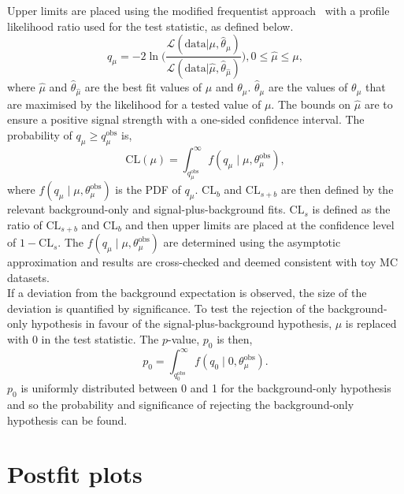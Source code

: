 Upper limits are placed using the modified frequentist approach~\cite{Junk:1999kv,Read:2002hq} with a profile likelihood ratio used for the test statistic, as defined below.
\begin{equation}
  q_{\mu} = -2 \ln \Biggl(\frac{\mathcal{L}(\text{data} | \mu, \hat{\theta}_{\mu})}{\mathcal{L}(\text{data} | \hat{\mu}, \hat{\theta}_{\hat{\mu}})}\Biggl), 0 \leq \hat{\mu} \leq \mu,
\end{equation}
where $\hat{\mu}$ and $\hat{\theta}_{\hat{\mu}}$ are the best fit values of $\mu$ and $\theta_\mu$. 
$\hat{\theta}_{\mu}$ are the values of $\theta_\mu$ that are maximised by the likelihood for a tested value of $\mu$.
The bounds on $\hat{\mu}$ are to ensure a positive signal strength with a one-sided confidence interval.
The probability of $q_{\mu} \geq q_{\mu}^{\text{obs}}$ is,
\begin{equation}
\text{CL}(\mu) = \int^{\infty}_{q_{\mu}^{\text{obs}}} f(q_{\mu} \mid \mu, \theta_{\mu}^{\text{obs}}),
\end{equation}
where $f(q_{\mu} \mid \mu, \theta_{\mu}^{\text{obs}})$ is the \ac{PDF} of $q_\mu$.
$\text{CL}_{b}$ and $\text{CL}_{s+b}$ are then defined by the relevant background-only and signal-plus-background fits.
$\text{CL}_s$ is defined as the ratio of $\text{CL}_{s+b}$ and $\text{CL}_{b}$ and then upper limits are placed at the confidence level of $1-\text{CL}_{s}$.
The $f(q_{\mu} \mid \mu, \theta_{\mu}^{\text{obs}})$ are determined using the asymptotic approximation \cite{Cowan:2010js} and results are cross-checked and deemed consistent with toy MC datasets. \\

If a deviation from the background expectation is observed, the size of the deviation is quantified by significance.
To test the rejection of the background-only hypothesis in favour of the signal-plus-background hypothesis, $\mu$ is replaced with 0 in the test statistic.
The $p$-value, $p_0$ is then,
\begin{equation}
p_{0} = \int^{\infty}_{q_{0}^{\text{obs}}} f(q_{0} \mid 0, \theta_{\mu}^{\text{obs}}).
\end{equation}
$p_{0}$ is uniformly distributed between 0 and 1 for the background-only hypothesis and so the probability and significance of rejecting the background-only hypothesis can be found. \\

\section{Postfit plots}


